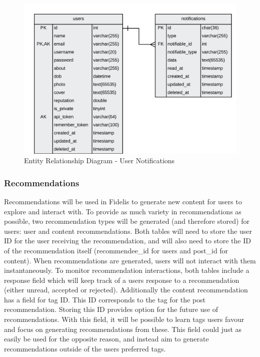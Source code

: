 \begin{figure}[H]
  \centering
  \includegraphics[width=1.0\textwidth]{Images/Design/Database/Notifications}
  \caption{Entity Relationship Diagram - User Notifications} \label{fig:ERD_Notifications}
\end{figure}

\subsubsection{Recommendations}
Recommendations will be used in Fidelis to generate new content for users to explore and interact with. To provide as much variety in recommendations as possible, two recommendation types will be generated (and therefore stored) for users: user and content recommendations. Both tables will need to store the user ID for the user receiving the recommendation, and will also need to store the ID of the recommendation itself (recommendee_id for users and post_id for content). When recommendations are generated, users will not interact with them instantaneously. To monitor recommendation interactions, both tables include a response field which will keep track of a users response to a recommendation (either unread, accepted or rejected). Additionally the content recommendation has a field for tag ID. This ID corresponds to the tag for the post recommendation. Storing this ID provides option for the future use of recommendations. With this field, it will be possible to learn tags users favour and focus on generating recommendations from these. This field could just as easily be used for the opposite reason, and instead aim to generate recommendations outside of the users preferred tags.

